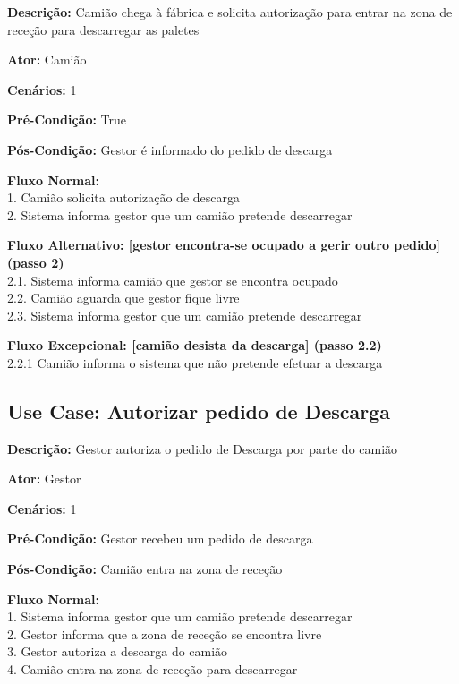 \documentclass[11pt]{article}
\begin{document}
\textbf{Descrição:} Camião chega à fábrica e solicita autorização para entrar na zona de receção para descarregar as paletes

\textbf{Ator:} Camião

\textbf{Cenários:} 1

\textbf{Pré-Condição:} True

\textbf{Pós-Condição:} Gestor é informado do pedido de descarga

\textbf{Fluxo Normal:}\\
        1. Camião solicita autorização de descarga\\
        2. Sistema informa gestor que um camião pretende descarregar
        
\textbf{Fluxo Alternativo: [gestor encontra-se ocupado a gerir outro pedido] (passo 2)}\\
        2.1. Sistema informa camião que gestor se encontra ocupado\\
        2.2. Camião aguarda que gestor fique livre\\
        2.3. Sistema informa gestor que um camião pretende descarregar
        
\textbf{Fluxo Excepcional: [camião desista da descarga] (passo 2.2)}\\
        2.2.1 Camião informa o sistema que não pretende efetuar a descarga


\vspace{3cm}


\subsection{Use Case: Autorizar pedido de Descarga}

\textbf{Descrição:} Gestor autoriza o pedido de Descarga por parte do camião

\textbf{Ator:} Gestor

\textbf{Cenários:} 1

\textbf{Pré-Condição:} Gestor recebeu um pedido de descarga

\textbf{Pós-Condição:} Camião entra na zona de receção

\textbf{Fluxo Normal:}\\
        1. Sistema informa gestor que um camião pretende descarregar\\
	    2. Gestor informa que a zona de receção se encontra livre\\
	    3. Gestor autoriza a descarga do camião\\
	    4. Camião entra na zona de receção para descarregar
        
\end{document}
